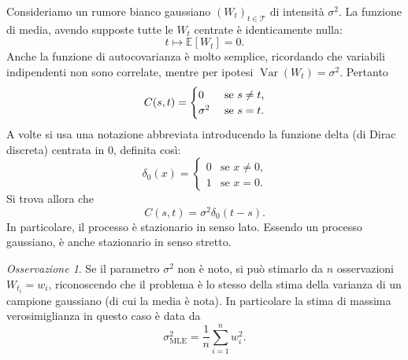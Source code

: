 \documentclass[
  italian,
  letterpaper,
]{book}
\newcommand{\bra}[1]{\left( #1 \right)}
\newcommand{\sqa}[1]{\left[ #1 \right]}
\newcommand{\E}[1]{\mathbb{E}\sqa{#1}}
\newcommand{\Var}[1]{\operatorname{Var}\bra{#1}}
\newcommand{\mle}{\operatorname{MLE}}
\theoremstyle{definition}
\theoremstyle{remark}
\newtheorem*{remark}{Osservazione}
\begin{document}
Consideriamo un rumore bianco gaussiano \((W_t)_{t \in \mathcal{T}}\) di
intensità \(\sigma^2\). La funzione di media, avendo supposte tutte le
\(W_t\) centrate è identicamente nulla: \[  t \mapsto \E{W_t} = 0.\]
Anche la funzione di autocovarianza è molto semplice, ricordando che
variabili indipendenti non sono correlate, mentre per ipotesi
\(\Var{W_t} = \sigma^2\). Pertanto
\[ C(s,t) = \begin{cases} 0 & \text{ se $s \neq t$,}\\
 \sigma^2  & \text{ se $ s = t$.}\end{cases}\] A volte si usa una
notazione abbreviata introducendo la funzione delta (di Dirac discreta)
centrata in \(0\), definita così:
\[ \delta_0(x) = \begin{cases} 0 & \text{se $x \neq 0$,}\\
 1 & \text{se $x=0$.}\end{cases}
 \] Si trova allora che \[ C(s,t)= \sigma^2 \delta_0( t-s).\] In
particolare, il processo è stazionario in senso lato. Essendo un
processo gaussiano, è anche stazionario in senso stretto.

\begin{remark}
Se il parametro \(\sigma^2\) non è noto, si può stimarlo da \(n\)
osservazioni \(W_{t_i} = w_i\), riconoscendo che il problema è lo stesso
della stima della varianza di un campione gaussiano (di cui la media è
nota). In particolare la stima di massima verosimiglianza in questo caso
è data da \[ \sigma_{\mle}^2 = \frac 1 n \sum_{i=1}^n  w_i^2.\]
\end{remark}
\end{document}

